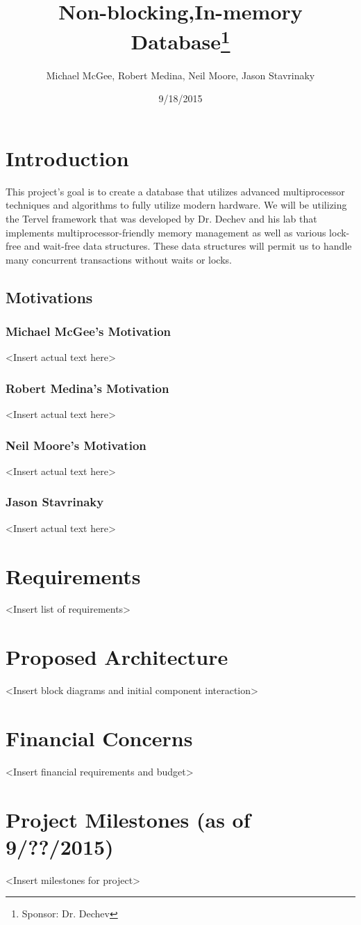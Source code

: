 \documentclass[letterpaper]{article}
\title{Non-blocking,In-memory Database\thanks{Sponsor: Dr. Dechev}}
\author{Michael McGee, Robert Medina, Neil Moore, Jason Stavrinaky}
\date{9/18/2015}
\begin{document}
  \maketitle
  \newpage

  \section{Introduction}
  This project's goal is to create a database that utilizes advanced multiprocessor techniques and algorithms to fully utilize modern hardware.
  We will be utilizing the Tervel framework that was developed by Dr. Dechev and his lab that implements multiprocessor-friendly memory management
  as well as various lock-free and wait-free data structures. These data structures will permit us to handle many concurrent transactions without 
  waits or locks.
  
  \subsection{Motivations}
  \subsubsection{Michael McGee's Motivation}
  \textless Insert actual text here\textgreater
  \subsubsection{Robert Medina's Motivation}
  \textless Insert actual text here\textgreater
  \subsubsection{Neil Moore's Motivation}
  \textless Insert actual text here\textgreater
  \subsubsection{Jason Stavrinaky}
  \textless Insert actual text here\textgreater
  
  \section{Requirements}
  \textless Insert list of requirements\textgreater
  
  \section{Proposed Architecture}
  \textless Insert block diagrams and initial component interaction\textgreater
  
  \section{Financial Concerns}
  \textless Insert financial requirements and budget\textgreater
  
  \section{Project Milestones (as of 9/??/2015)}
  \textless Insert milestones for project\textgreater
\end{document}

